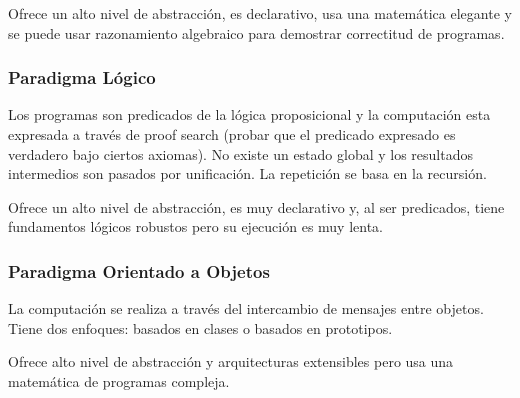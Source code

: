 Ofrece un alto nivel de abstracción, es declarativo, usa una matemática elegante y se puede usar razonamiento algebraico para demostrar correctitud de programas.

\subsubsection{Paradigma Lógico}
Los programas son predicados de la lógica proposicional y la computación esta expresada a través de proof search (probar que el predicado expresado es verdadero bajo ciertos axiomas). No existe un estado global y los resultados intermedios son pasados por unificación. La repetición se basa en la recursión.

Ofrece un alto nivel de abstracción, es muy declarativo y, al ser predicados, tiene fundamentos lógicos robustos pero su ejecución es muy lenta.

\subsubsection{Paradigma Orientado a Objetos}
La computación se realiza a través del intercambio de mensajes entre objetos. Tiene dos enfoques: basados en clases o basados en prototipos.

Ofrece alto nivel de abstracción y arquitecturas extensibles pero usa una matemática de programas compleja.

